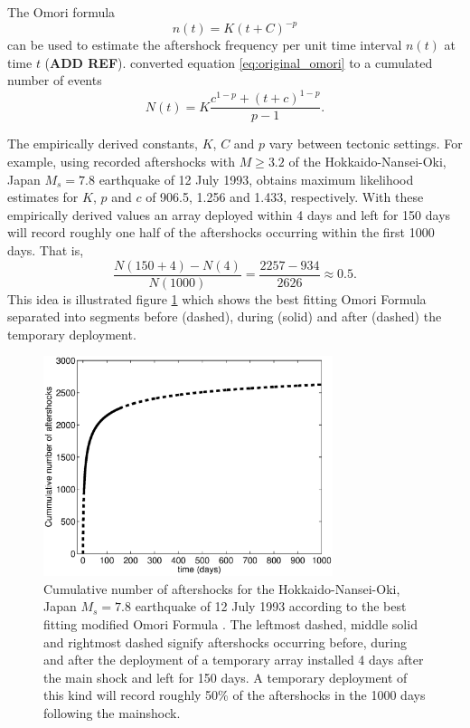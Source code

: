 \documentclass[extra]{gji}
\begin{document}
The Omori formula
\begin{equation}
\label{eq:original_omori}
 n(t) = K(t+C)^{-p}
\end{equation}
can be used to estimate the aftershock frequency per unit time
interval $n(t)$ at time $t$ (\textbf{ADD REF}). \citet{dr_Utsu95a}
converted equation \ref{eq:original_omori} to a cumulated number of
events
\begin{equation}
N(t) = K \frac{c^{1-p} + (t+c)^{1-p}}{p-1}.
\end{equation}

The empirically derived constants, $K$, $C$ and $p$ vary between
tectonic settings. For example, using recorded aftershocks with
$M\ge3.2$ of the  Hokkaido-Nansei-Oki, Japan $M_s=7.8$ earthquake of
12 July 1993, \citet{dr_Utsu95a} obtains maximum likelihood
estimates for $K$, $p$ and $c$ of 906.5, 1.256 and 1.433,
respectively.  With these empirically derived values an array
deployed within 4 days and left for 150 days will record roughly one
half of the aftershocks occurring within the first 1000 days. That
is,
\begin{equation}
\frac{N(150+4)-N(4)}{N(1000)} = \frac{2257-934}{2626} \approx 0.5.
\end{equation}
This idea is illustrated figure \ref{fig:Omorifigure} which shows
the best fitting Omori Formula separated into segments before
(dashed), during (solid) and after (dashed) the temporary
deployment.

\begin{figure}
\noindent\includegraphics[width = 20pc]{diags/OmoriFigure.eps}
\caption{Cumulative number of aftershocks for the
Hokkaido-Nansei-Oki, Japan $M_s=7.8$ earthquake of 12 July 1993
according to the best fitting modified Omori Formula
\citep{dr_Utsu95a}. The leftmost dashed, middle solid and rightmost
dashed signify aftershocks occurring before, during and after the
deployment of a temporary array installed 4 days after the main
shock and left for 150 days. A temporary deployment of this kind
will record roughly 50\% of the aftershocks in the 1000 days
following the mainshock. } \label{fig:Omorifigure}
\end{figure}
\end{document}
